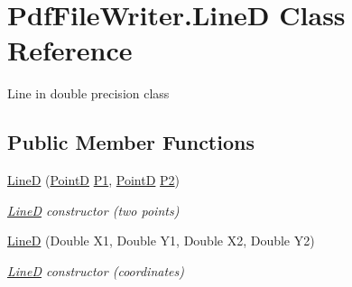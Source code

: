 \hypertarget{class_pdf_file_writer_1_1_line_d}{}\section{Pdf\+File\+Writer.\+LineD Class Reference}
\label{class_pdf_file_writer_1_1_line_d}


Line in double precision class  


\subsection*{Public Member Functions}
\begin{DoxyCompactItemize}
\item 
\hyperlink{class_pdf_file_writer_1_1_line_d_a069f452f17e2877a9095b06d4231fa42}{LineD} (\hyperlink{class_pdf_file_writer_1_1_point_d}{PointD} \hyperlink{class_pdf_file_writer_1_1_line_d_ac8339997350c1b6ab278a58c3e45fa77}{P1}, \hyperlink{class_pdf_file_writer_1_1_point_d}{PointD} \hyperlink{class_pdf_file_writer_1_1_line_d_af1c3aaed1d379ac1ac42ec105d2f7e08}{P2})
\begin{DoxyCompactList}\small\item\em \hyperlink{class_pdf_file_writer_1_1_line_d}{LineD} constructor (two points) \end{DoxyCompactList}\item 
\hyperlink{class_pdf_file_writer_1_1_line_d_a4aa0eb12c85f7a02d53aa8a41f93d44e}{LineD} (Double X1, Double Y1, Double X2, Double Y2)
\begin{DoxyCompactList}\small\item\em \hyperlink{class_pdf_file_writer_1_1_line_d}{LineD} constructor (coordinates) \end{DoxyCompactList}\end{DoxyCompactItemize}
